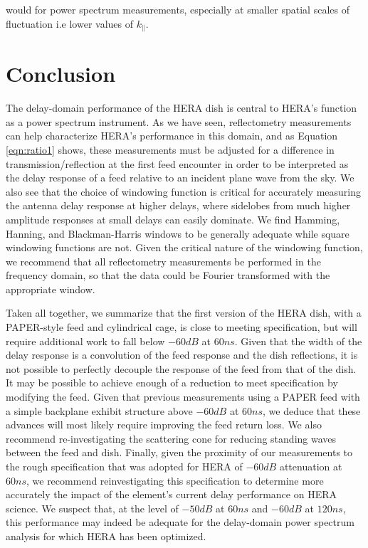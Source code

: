 \documentclass[twocolumn]{emulateapj}
\begin{document}
would  for power spectrum measurements, especially at smaller spatial scales of fluctuation i.e lower values of $k_{\parallel}$.




\section{\textbf{Conclusion}}

The delay-domain performance of the HERA dish is central to HERA's function as a power spectrum instrument.
As we have seen, reflectometry measurements can help characterize HERA's performance in this domain, and
as Equation \ref{eqn:ratio1} shows, these measurements must be adjusted for a difference in transmission/reflection
at the first feed encounter in order to be interpreted as the delay response of a feed relative to an incident
plane wave from the sky.  We also see that the choice of windowing function is critical for accurately measuring the
antenna delay response at higher delays, where sidelobes from much higher amplitude responses at small delays can easily
dominate.  We find Hamming, Hanning, and Blackman-Harris windows to be generally adequate while square windowing functions are not.
Given the critical nature of the windowing function, we recommend that all reflectometry measurements be performed in the
frequency domain, so that the data could be Fourier transformed with the appropriate window.

Taken all together, we summarize that the first version of the HERA dish, with a PAPER-style feed and cylindrical cage, is close to meeting
specification, but will require additional work to fall below $-60dB$ at $60ns$.  Given that the width of the delay response is a convolution
of the feed response and the dish reflections, it is not possible to perfectly decouple the response of the feed from that of the dish.
It may be possible to achieve enough of a reduction to meet specification by modifying the feed.
Given that previous measurements using a PAPER feed with a simple backplane exhibit structure above $-60dB$ at $60ns$,
we deduce that these advances will most likely require improving the feed return loss.  We also recommend re-investigating the scattering
cone for reducing standing waves between the feed and dish.  Finally, given the proximity of our measurements to the rough 
specification that was adopted for 
HERA of $-60dB$ attenuation at $60ns$, we recommend reinvestigating this specification to determine more accurately the impact of 
the element's current delay performance on HERA science.  We suspect that, at the level of $-50dB$ at $60ns$ and $-60dB$ at $120ns$, this
performance may indeed be adequate for the delay-domain power spectrum analysis for which HERA has been optimized.

{}

\end{document}
